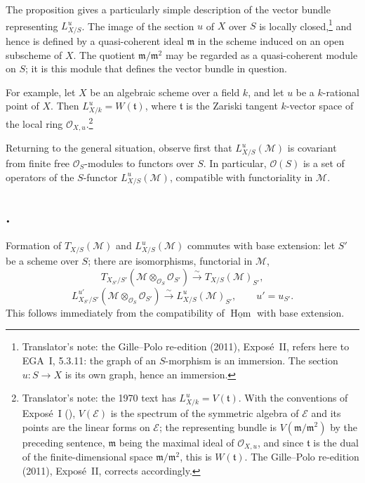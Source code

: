 %
The proposition gives a particularly simple description of the vector
bundle representing \(L^u_{X/S}\). The image of the section \(u\) of
\(X\) over \(S\) is locally closed,\footnote{Translator's note: the
Gille--Polo re-edition (2011), Expos\'e~II, refers here to EGA~I, 5.3.11: the
graph of an \(S\)-morphism is an immersion. The section \(u\colon S\to X\) is
its own graph, hence an immersion.}
and hence is defined by a quasi-coherent ideal \(\mathfrak m\) in the
scheme induced on an open subscheme of \(X\). The quotient
\(\mathfrak m/\mathfrak m^2\) may be regarded as a quasi-coherent module
on \(S\); it is this module that defines the vector bundle in question.

For example, let \(X\) be an algebraic scheme over a field \(k\), and let
\(u\) be a \(k\)-rational point of \(X\). Then
\(L^u_{X/k}=W(\mathfrak t)\), where \(\mathfrak t\) is the Zariski tangent
\(k\)-vector space of the local ring \(\mathcal O_{X,u}\).\footnote{Translator's
note: the 1970 text has \(L^u_{X/k}=V(\mathfrak t)\). With the conventions
of Expos\'e~I (), \(V(\mathcal E)\) is the spectrum of the
symmetric algebra of \(\mathcal E\) and its points are the linear forms on
\(\mathcal E\); the representing bundle is \(V(\mathfrak m/\mathfrak m^2)\)
by the preceding sentence, \(\mathfrak m\) being the maximal ideal of
\(\mathcal O_{X,u}\), and since \(\mathfrak t\) is the dual of the
finite-dimensional space \(\mathfrak m/\mathfrak m^2\), this is
\(W(\mathfrak t)\). The Gille--Polo re-edition (2011), Expos\'e~II, corrects
accordingly.}

Returning to the general situation, observe first that
\(L^u_{X/S}(\mathcal M)\) is covariant from finite free
\(\mathcal O_S\)-modules to functors over \(S\). In particular,
\(\mathcal O(S)\) is a set of operators of the \(S\)-functor
\(L^u_{X/S}(\mathcal M)\), compatible with functoriality in
\(\mathcal M\).

\subsection*{.}
Formation of \(T_{X/S}(\mathcal M)\) and \(L^u_{X/S}(\mathcal M)\)
commutes with base extension: let \(S'\) be a scheme over \(S\); there are
isomorphisms, functorial in \(\mathcal M\),
\[
  T_{X_{S'}/S'}(\mathcal M\otimes_{\mathcal O_S}\mathcal O_{S'})
    \xrightarrow{\sim} T_{X/S}(\mathcal M)_{S'},
\]
\[
  L^{u'}_{X_{S'}/S'}(\mathcal M\otimes_{\mathcal O_S}\mathcal O_{S'})
    \xrightarrow{\sim} L^u_{X/S}(\mathcal M)_{S'},
  \qquad u'=u_{S'}.
\]
This follows immediately from the compatibility of
\(\underline{\operatorname{Hom}}\) with base extension.

